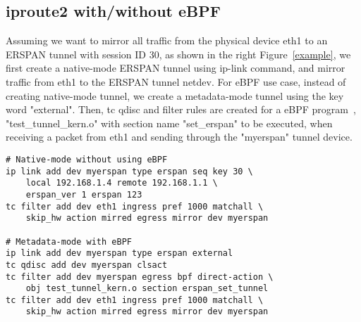 \documentclass[10pt]{sigplanconf}
\begin{document}

\subsection{iproute2 with/without eBPF}\label{iproute2}
Assuming we want to mirror all traffic from the physical device eth1
to an ERSPAN tunnel with session ID 30, as shown in the right Figure~\ref{example},
we first create a native-mode ERSPAN tunnel using ip-link command,
and mirror traffic from eth1 to the ERSPAN tunnel netdev.
For eBPF use case, instead of creating native-mode tunnel, we create
a metadata-mode tunnel using the key word "external".
Then, tc qdisc and filter rules are created for a eBPF program~\cite{daniel1,daniel2},
"test\_tunnel\_kern.o" with section name "set\_erspan" to be executed,
when receiving a packet from eth1 and sending through the "myerspan"
tunnel device.

\begin{verbatim}
# Native-mode without using eBPF
ip link add dev myerspan type erspan seq key 30 \
    local 192.168.1.4 remote 192.168.1.1 \
    erspan_ver 1 erspan 123
tc filter add dev eth1 ingress pref 1000 matchall \
    skip_hw action mirred egress mirror dev myerspan

# Metadata-mode with eBPF
ip link add dev myerspan type erspan external
tc qdisc add dev myerspan clsact
tc filter add dev myerspan egress bpf direct-action \
    obj test_tunnel_kern.o section erspan_set_tunnel
tc filter add dev eth1 ingress pref 1000 matchall \
    skip_hw action mirred egress mirror dev myerspan
\end{verbatim}
\end{document}
